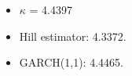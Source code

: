 \documentclass{beamer}
\begin{document}
\begin{frame}
   \begin{itemize}
   \item $\kappa$ = 4.4397
   \item Hill estimator: 4.3372.
   \item GARCH(1,1): 4.4465.
   \end{itemize}
 \end{frame}



\end{document}
